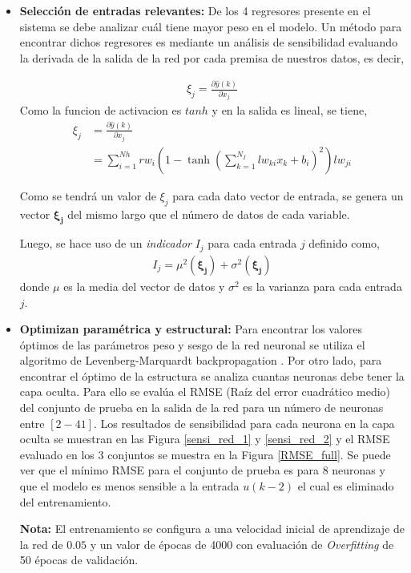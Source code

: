 \documentclass[12pt]{article}
\begin{document}
\begin{itemize}
	
	\item \textbf{Selección de entradas relevantes:} De los 4 regresores presente en el sistema se debe analizar cuál tiene mayor peso en el modelo. Un método para encontrar dichos regresores es mediante un análisis de sensibilidad evaluando la derivada de la salida de la red por cada premisa de nuestros datos, es decir,
	
	\begin{align}
	\xi_j = \frac{\partial \hat{y}(k)}{\partial x_j}		
	\end{align}
	Como la funcion de activacion es $tanh$ y en la salida es lineal, se tiene,
	\begin{align}
	\xi_j &= \frac{\partial \hat{y}(k)}{\partial x_j} \nonumber \\
	&= \sum_{i=1}^{Nh} rw_i \left(1 - \tanh\left(\sum_{k=1}^{N_I} lw_{ki} x_k + b_i\right)^2 \right) lw_{ji}		
	\end{align}
	
	Como se tendrá un valor de $\xi_j$ para cada dato vector de entrada, se genera un vector $\boldsymbol{\xi_j}$ del mismo largo que el número de datos de cada variable.
	
	Luego, se hace uso de un \textit{indicador} $I_j$ para cada entrada $j$ definido como,
	\begin{align}
	I_j = \mu^2 (\boldsymbol{\xi_j}) + \sigma^2(\boldsymbol{\xi_j})
	\end{align}
	donde $\mu$ es la media del vector de datos y $\sigma^2$ es la varianza para cada entrada $j$.
	
	\item \textbf{Optimizan paramétrica y estructural:} Para encontrar los valores óptimos de las parámetros peso y sesgo de la red neuronal se utiliza el algoritmo de Levenberg-Marquardt backpropagation \cite{matlab_train}. Por otro lado, para encontrar el óptimo de la estructura se analiza cuantas neuronas debe tener la capa oculta. Para ello se evalúa el RMSE (Raíz del error cuadrático medio) del conjunto de prueba en la salida de la red para un número de neuronas entre $[2-41]$. Los resultados de sensibilidad para cada neurona en la capa oculta se muestran en las Figura \ref{sensi_red_1} y \ref{sensi_red_2} y el RMSE evaluado en los 3 conjuntos se muestra en la Figura \ref{RMSE_full}. Se puede ver que el mínimo RMSE para el conjunto de prueba es para $8$ neuronas y que el modelo es menos sensible  a la entrada $u(k-2)$ el cual es eliminado del entrenamiento.
	
	\textbf{Nota:} El entrenamiento se configura a una velocidad inicial de aprendizaje de la red de $0.05$ y un valor de épocas de 4000 con evaluación de \textit{Overfitting} de 50 épocas de validación.
	

\end{itemize}
\end{document}
